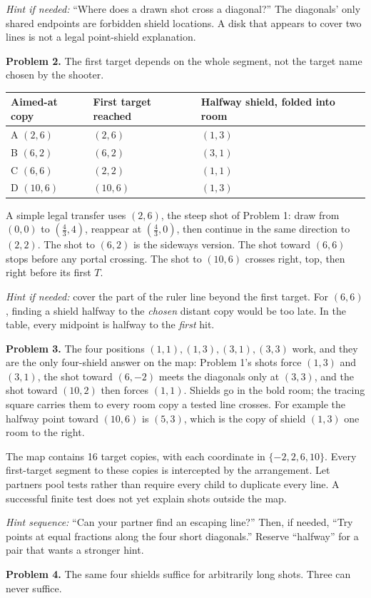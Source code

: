 \documentclass[11pt,letterpaper]{article}
\newcommand{\sectiontitle}[1]{\par\vspace{4pt}{\large\bfseries #1}\par}
\newcommand{\answer}[1]{\par\vspace{3pt}\textbf{Problem #1.} }
\begin{document}
\textit{Hint if needed:} ``Where does a drawn shot cross a diagonal?'' The diagonals' only shared endpoints are forbidden shield locations. A disk that appears to cover two lines is not a legal point-shield explanation.

\answer{2} The first target depends on the whole segment, not the target name chosen by the shooter.
\begin{center}
\renewcommand{\arraystretch}{1.32}
\begin{tabular}{@{}lll@{}}
Aimed-at copy & First target reached & Halfway shield, folded into room\\\hline
A $(2,6)$ & $(2,6)$ & $(1,3)$\\
B $(6,2)$ & $(6,2)$ & $(3,1)$\\
C $(6,6)$ & $(2,2)$ & $(1,1)$\\
D $(10,6)$ & $(10,6)$ & $(1,3)$
\end{tabular}
\end{center}
A simple legal transfer uses $(2,6)$, the steep shot of Problem 1: draw from $(0,0)$ to $(\frac43,4)$, reappear at $(\frac43,0)$, then continue in the same direction to $(2,2)$. The shot to $(6,2)$ is the sideways version. The shot toward $(6,6)$ stops before any portal crossing. The shot to $(10,6)$ crosses right, top, then right before its first $T$.

\textit{Hint if needed:} cover the part of the ruler line beyond the first target. For $(6,6)$, finding a shield halfway to the \emph{chosen} distant copy would be too late. In the table, every midpoint is halfway to the \emph{first} hit.

\answer{3} The four positions $(1,1),(1,3),(3,1),(3,3)$ work, and they are the only four-shield answer on the map: Problem 1's shots force $(1,3)$ and $(3,1)$, the shot toward $(6,-2)$ meets the diagonals only at $(3,3)$, and the shot toward $(10,2)$ then forces $(1,1)$. Shields go in the bold room; the tracing square carries them to every room copy a tested line crosses. For example the halfway point toward $(10,6)$ is $(5,3)$, which is the copy of shield $(1,3)$ one room to the right.

The map contains 16 target copies, with each coordinate in $\{-2,2,6,10\}$. Every first-target segment to these copies is intercepted by the arrangement. Let partners pool tests rather than require every child to duplicate every line. A successful finite test does not yet explain shots outside the map.

\textit{Hint sequence:} ``Can your partner find an escaping line?'' Then, if needed, ``Try points at equal fractions along the four short diagonals.'' Reserve ``halfway'' for a pair that wants a stronger hint.
\newpage
\sectiontitle{Why four work for every shot}
\answer{4} The same four shields suffice for arbitrarily long shots. Three can never suffice.
\end{document}
